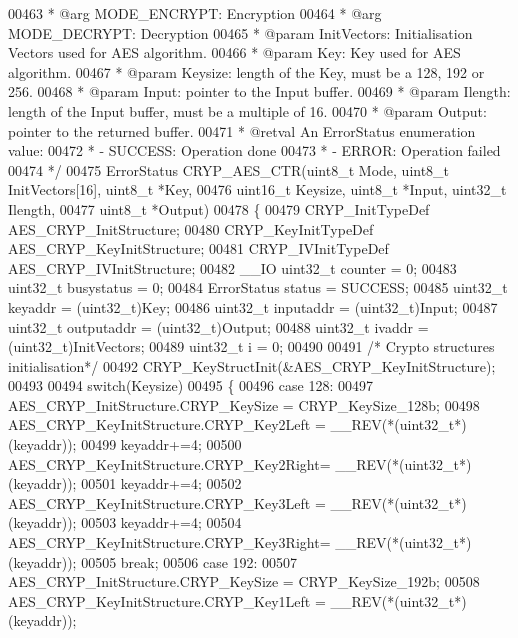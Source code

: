 \begin{DoxyCode}
00463 \textcolor{comment}{  *            @arg MODE\_ENCRYPT: Encryption}
00464 \textcolor{comment}{  *            @arg MODE\_DECRYPT: Decryption}
00465 \textcolor{comment}{  * @param  InitVectors: Initialisation Vectors used for AES algorithm.}
00466 \textcolor{comment}{  * @param  Key: Key used for AES algorithm.}
00467 \textcolor{comment}{  * @param  Keysize: length of the Key, must be a 128, 192 or 256.}
00468 \textcolor{comment}{  * @param  Input: pointer to the Input buffer.}
00469 \textcolor{comment}{  * @param  Ilength: length of the Input buffer, must be a multiple of 16.}
00470 \textcolor{comment}{  * @param  Output: pointer to the returned buffer.}
00471 \textcolor{comment}{  * @retval An ErrorStatus enumeration value:}
00472 \textcolor{comment}{  *          - SUCCESS: Operation done}
00473 \textcolor{comment}{  *          - ERROR: Operation failed}
00474 \textcolor{comment}{  */}
00475 ErrorStatus CRYP_AES_CTR(uint8\_t Mode, uint8\_t InitVectors[16], uint8\_t *Key,
00476                          uint16\_t Keysize, uint8\_t *Input, uint32\_t Ilength,
00477                          uint8\_t *Output)
00478 \{
00479   CRYP\_InitTypeDef AES\_CRYP\_InitStructure;
00480   CRYP\_KeyInitTypeDef AES\_CRYP\_KeyInitStructure;
00481   CRYP\_IVInitTypeDef AES\_CRYP\_IVInitStructure;
00482   \_\_IO uint32\_t counter = 0;
00483   uint32\_t busystatus = 0;
00484   ErrorStatus status = SUCCESS;
00485   uint32\_t keyaddr    = (uint32\_t)Key;
00486   uint32\_t inputaddr  = (uint32\_t)Input;
00487   uint32\_t outputaddr = (uint32\_t)Output;
00488   uint32\_t ivaddr     = (uint32\_t)InitVectors;
00489   uint32\_t i = 0;
00490 
00491   \textcolor{comment}{/* Crypto structures initialisation*/}
00492   CRYP_KeyStructInit(&AES\_CRYP\_KeyInitStructure);
00493 
00494   \textcolor{keywordflow}{switch}(Keysize)
00495   \{
00496     \textcolor{keywordflow}{case} 128:
00497     AES\_CRYP\_InitStructure.CRYP_KeySize = CRYP_KeySize_128b;
00498     AES\_CRYP\_KeyInitStructure.CRYP\_Key2Left = \_\_REV(*(uint32\_t*)(keyaddr));
00499     keyaddr+=4;
00500     AES\_CRYP\_KeyInitStructure.CRYP\_Key2Right= \_\_REV(*(uint32\_t*)(keyaddr));
00501     keyaddr+=4;
00502     AES\_CRYP\_KeyInitStructure.CRYP\_Key3Left = \_\_REV(*(uint32\_t*)(keyaddr));
00503     keyaddr+=4;
00504     AES\_CRYP\_KeyInitStructure.CRYP\_Key3Right= \_\_REV(*(uint32\_t*)(keyaddr));
00505     \textcolor{keywordflow}{break};
00506     \textcolor{keywordflow}{case} 192:
00507     AES\_CRYP\_InitStructure.CRYP_KeySize  = CRYP_KeySize_192b;
00508     AES\_CRYP\_KeyInitStructure.CRYP\_Key1Left = \_\_REV(*(uint32\_t*)(keyaddr));

\end{DoxyCode}
